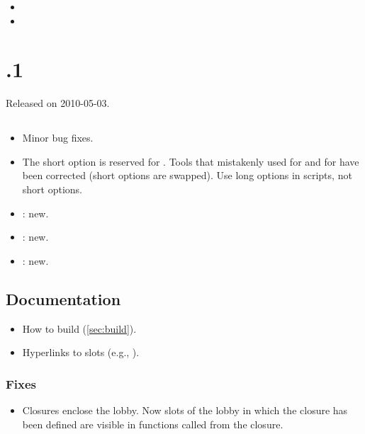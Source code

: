 \begin{itemize}
\item {}
\item {}
\end{itemize}

\section{.1}
Released on 2010-05-03.

\subsection{\us}
\begin{itemize}
\item Minor bug fixes.
\item The short option  is reserved for .
  Tools that mistakenly used  for  and
   for  have been corrected (short options are
  swapped).  Use long options in scripts, not short options.
\item {}: new.
\item {}: new.
\item {}: new.
\end{itemize}

\subsection{Documentation}

\begin{itemize}
\item How to build \usdk (\autoref{sec:build}).
\item Hyperlinks to slots (e.g., ).
\end{itemize}

\subsubsection{Fixes}
\begin{itemize}
\item Closures enclose the lobby.  Now slots of the lobby in which the
  closure has been defined are visible in functions called from the closure.
\end{itemize}

\section{}

